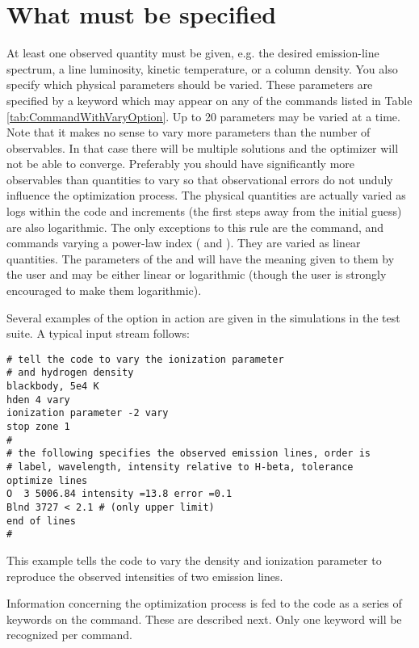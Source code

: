 \section{What must be specified}

At least one observed quantity must be given, e.g. the desired emission-line spectrum, a line luminosity,
kinetic temperature, or a column density.
You also specify
which physical parameters should be varied.
These parameters are specified by a
keyword  which may appear on any of the
commands listed in
Table \ref{tab:CommandWithVaryOption}.
Up to 20 parameters may be varied at a time.
Note that it makes no sense to vary more parameters than the number of observables.
In that case there will be multiple solutions and the optimizer will not be able to
converge. Preferably you should have significantly more observables than quantities
to vary so that observational errors do not unduly influence the optimization process.
The physical quantities
are actually varied as logs within the code and increments
(the first steps away from the initial guess)
are also logarithmic. The only exceptions to this rule are the
 command, and commands varying a power-law index
( and ).
They are varied as linear quantities.
The parameters of the  and  will
have the meaning given to them by the user and may be either linear or
logarithmic (though the user is strongly encouraged to make them logarithmic).

Several examples of the  option in action
are given in the
 simulations in the test suite.
A typical input stream follows:
\begin{verbatim}
# tell the code to vary the ionization parameter
# and hydrogen density
blackbody, 5e4 K
hden 4 vary
ionization parameter -2 vary
stop zone 1
#
# the following specifies the observed emission lines, order is
# label, wavelength, intensity relative to H-beta, tolerance
optimize lines
O  3 5006.84 intensity =13.8 error =0.1
Blnd 3727 < 2.1 # (only upper limit)
end of lines
#
\end{verbatim}
This example tells the code to vary the density and ionization parameter
to reproduce the observed intensities of two emission lines.

Information concerning the optimization process is fed to the code
as a series of keywords on the  command.
These are described next.
Only one keyword will be recognized per  command.

